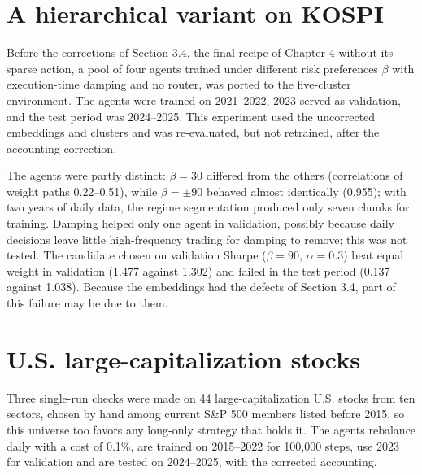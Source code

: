 \documentclass[12pt,a4paper]{report}
\begin{document}
\section{A hierarchical variant on
KOSPI}\label{a-hierarchical-variant-on-kospi}

Before the corrections of Section 3.4, the final recipe of Chapter 4
without its sparse action, a pool of four agents trained under different
risk preferences \(\beta\) with execution-time damping and no router,
was ported to the five-cluster environment. The agents were trained on
2021--2022, 2023 served as validation, and the test period was
2024--2025. This experiment used the uncorrected embeddings and clusters
and was re-evaluated, but not retrained, after the accounting
correction.

The agents were partly distinct: \(\beta = 30\) differed from the others
(correlations of weight paths 0.22--0.51), while \(\beta = \pm 90\)
behaved almost identically (0.955); with two years of daily data, the
regime segmentation produced only seven chunks for training. Damping
helped only one agent in validation, possibly because daily decisions
leave little high-frequency trading for damping to remove; this was not
tested. The candidate chosen on validation Sharpe (\(\beta = 90\),
\(\alpha = 0.3\)) beat equal weight in validation (1.477 against 1.302)
and failed in the test period (0.137 against 1.038). Because the
embeddings had the defects of Section 3.4, part of this failure may be
due to them.

\section{U.S. large-capitalization
stocks}\label{u.s.-large-capitalization-stocks}

Three single-run checks were made on 44 large-capitalization U.S. stocks
from ten sectors, chosen by hand among current S\&P 500 members listed
before 2015, so this universe too favors any long-only strategy that
holds it. The agents rebalance daily with a cost of 0.1\%, are trained
on 2015--2022 for 100,000 steps, use 2023 for validation and are tested
on 2024--2025, with the corrected accounting.
\end{document}
